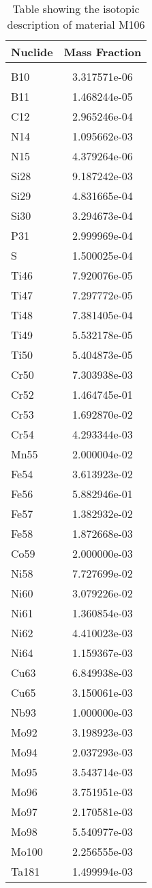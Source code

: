 \begin{centering}
\begin{table}[ht!]
\begin{tabular}{l | c}
\hline
Nuclide & Mass Fraction\\
\hline
\\
B10 & 3.317571e-06\\
B11 & 1.468244e-05\\
C12 & 2.965246e-04\\
N14 & 1.095662e-03\\
N15 & 4.379264e-06\\
Si28 & 9.187242e-03\\
Si29 & 4.831665e-04\\
Si30 & 3.294673e-04\\
P31 & 2.999969e-04\\
S & 1.500025e-04\\
Ti46 & 7.920076e-05\\
Ti47 & 7.297772e-05\\
Ti48 & 7.381405e-04\\
Ti49 & 5.532178e-05\\
Ti50 & 5.404873e-05\\
Cr50 & 7.303938e-03\\
Cr52 & 1.464745e-01\\
Cr53 & 1.692870e-02\\
Cr54 & 4.293344e-03\\
Mn55 & 2.000004e-02\\
Fe54 & 3.613923e-02\\
Fe56 & 5.882946e-01\\
Fe57 & 1.382932e-02\\
Fe58 & 1.872668e-03\\
Co59 & 2.000000e-03\\
Ni58 & 7.727699e-02\\
Ni60 & 3.079226e-02\\
Ni61 & 1.360854e-03\\
Ni62 & 4.410023e-03\\
Ni64 & 1.159367e-03\\
Cu63 & 6.849938e-03\\
Cu65 & 3.150061e-03\\
Nb93 & 1.000000e-03\\
Mo92 & 3.198923e-03\\
Mo94 & 2.037293e-03\\
Mo95 & 3.543714e-03\\
Mo96 & 3.751951e-03\\
Mo97 & 2.170581e-03\\
Mo98 & 5.540977e-03\\
Mo100 & 2.256555e-03\\
Ta181 & 1.499994e-03
\end{tabular}
\caption{Table showing the isotopic description of material M106}
\label{table:material_M106}
\end{table}\clearpage


\end{centering}
